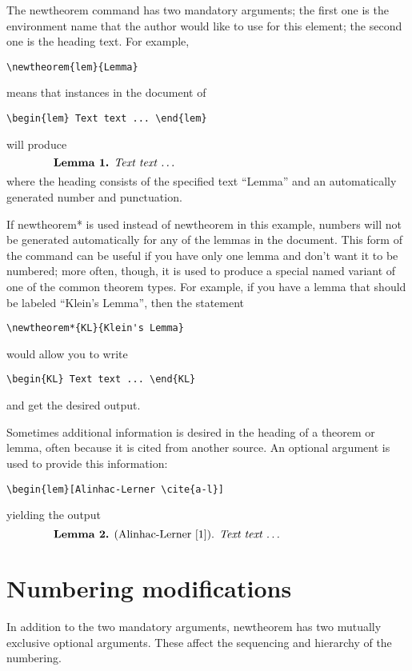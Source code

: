 \documentclass[twoside]{article}
\providecommand{\qq}[1]{\textquotedblleft#1\textquotedblright}
\newcommand{\ntt}{%
  \fontfamily\ttdefault \fontseries\mddefault \fontshape\updefault
  \selectfont
}
\DeclareRobustCommand{\cn}[1]{{\ntt\bslchar#1}}
\begin{document}
The \cn{newtheorem} command has two mandatory arguments; the first one
is the environment name that the author would like to use for this
element; the second one is the heading text. For example,
\begin{verbatim}
\newtheorem{lem}{Lemma}
\end{verbatim}
means that instances in the document of
\begin{verbatim}
\begin{lem} Text text ... \end{lem}
\end{verbatim}
will produce
\[\makebox[.8\columnwidth]{%
  \textbf{Lemma 1.} \textit{Text text \dots}\hfill}\]
where the heading consists of the specified text \qq{Lemma} and an
automatically generated number and punctuation.

If \cn{newtheorem*} is used instead of \cn{newtheorem} in this
example, numbers will not be generated automatically for
any of the lemmas in the document. This form of the command can be
useful if you have only one lemma and don't want it to be
numbered; more often, though, it is used to produce a special named
variant of one of the common theorem types. For example, if you have a
lemma that should be labeled \qq{Klein's Lemma}, then the statement
\begin{verbatim}
\newtheorem*{KL}{Klein's Lemma}
\end{verbatim}
would allow you to write
\begin{verbatim}
\begin{KL} Text text ... \end{KL}
\end{verbatim}
and get the desired output.

Sometimes additional information is desired in the heading of a
theorem or lemma, often because it is cited from another source.
An optional argument is used to provide this information:
\begin{verbatim}
\begin{lem}[Alinhac-Lerner \cite{a-l}]
\end{verbatim}
yielding the output
\[\makebox[.8\columnwidth]{%
  \textbf{Lemma 2.} (Alinhac-Lerner [1]). \textit{Text text \dots}\hfill}\]


\section{Numbering modifications}

In addition to the two mandatory arguments, \cn{newtheorem} has two
mutually exclusive optional arguments. These affect the
sequencing and hierarchy of the numbering.
\end{document}
